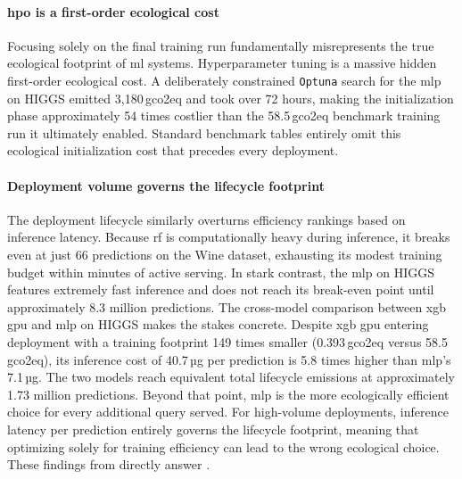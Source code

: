 \paragraph{\gls{hpo} is a first-order ecological cost}
Focusing solely on the final training run fundamentally misrepresents the true ecological footprint of \gls{ml} systems. Hyperparameter tuning is a massive hidden first-order ecological cost. A deliberately constrained \texttt{Optuna} search for the \gls{mlp} on HIGGS emitted 3{,}180\,\gls{gco2eq} and took over 72 hours, making the initialization phase approximately 54 times costlier than the 58.5\,\gls{gco2eq} benchmark training run it ultimately enabled. Standard benchmark tables entirely omit this ecological initialization cost that precedes every deployment.

\paragraph{Deployment volume governs the lifecycle footprint}
The deployment lifecycle similarly overturns efficiency rankings based on inference latency. Because \gls{rf} is computationally heavy during inference, it breaks even at just 66 predictions on the Wine dataset, exhausting its modest training budget within minutes of active serving. In stark contrast, the \gls{mlp} on HIGGS features extremely fast inference and does not reach its break-even point until approximately 8.3 million predictions. The cross-model comparison between \gls{xgb} \gls{gpu} and \gls{mlp} on HIGGS makes the stakes concrete. Despite \gls{xgb} \gls{gpu} entering deployment with a training footprint 149 times smaller (0.393\,\gls{gco2eq} versus 58.5\,\gls{gco2eq}), its inference cost of 40.7\,µg per prediction is 5.8 times higher than \gls{mlp}'s 7.1\,µg. The two models reach equivalent total lifecycle emissions at approximately 1.73 million predictions. Beyond that point, \gls{mlp} is the more ecologically efficient choice for every additional query served. For high-volume deployments, inference latency per prediction entirely governs the lifecycle footprint, meaning that optimizing solely for training efficiency can lead to the wrong ecological choice. These findings from  directly answer .

